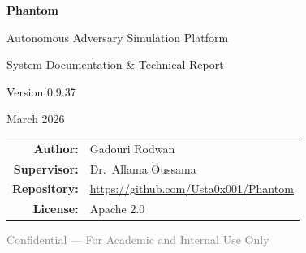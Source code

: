 \documentclass[12pt,a4paper]{report}
\begin{document}
\begin{titlepage}
\centering
\vspace*{2cm}
{\Huge\bfseries\textcolor{phantomblue}{Phantom}\par}
\vspace{0.5cm}
{\LARGE Autonomous Adversary Simulation Platform\par}
\vspace{0.3cm}
{\large System Documentation \& Technical Report\par}
\vspace{1.5cm}
{\Large Version 0.9.37\par}
\vspace{0.5cm}
{\large March 2026\par}
\vspace{3cm}
\begin{tabular}{rl}
\textbf{Author:}      & Gadouri Rodwan \\[4pt]
\textbf{Supervisor:}   & Dr.\ Allama Oussama \\[4pt]
\textbf{Repository:}   & \url{https://github.com/Usta0x001/Phantom} \\[4pt]
\textbf{License:}      & Apache 2.0 \\
\end{tabular}
\vfill
{\small\textcolor{gray}{Confidential --- For Academic and Internal Use Only}}
\end{titlepage}

\begin{abstract}
\noindent
Phantom is an AI-powered autonomous penetration testing platform that leverages
Large Language Models (LLMs) to discover, exploit, and verify real-world
vulnerabilities in web applications, APIs, and network services --- entirely
without human intervention. Unlike signature-based scanners that match known
patterns, Phantom employs a ReAct (Reason + Act) agent loop that reads HTTP
responses, reasons about attack surfaces, chains multi-step exploits, and
produces working proof-of-concept code.

This report provides a comprehensive technical documentation of the Phantom
system covering its architecture, design philosophy, implementation details,
security controls, scanning workflows, LLM integration, tool ecosystem, and
quality assurance process. It serves as both a definitive reference for
developers and a formal academic document describing the system's contributions
to the field of AI-assisted security testing.

Measured against the OWASP Juice Shop benchmark, Phantom v0.9.37 discovered
7 vulnerabilities (5 Critical, 2 High) in 26 iterations over 15 minutes at
a cost of \$0.36 --- a 250\% improvement over earlier versions.
\end{abstract}
\end{document}
